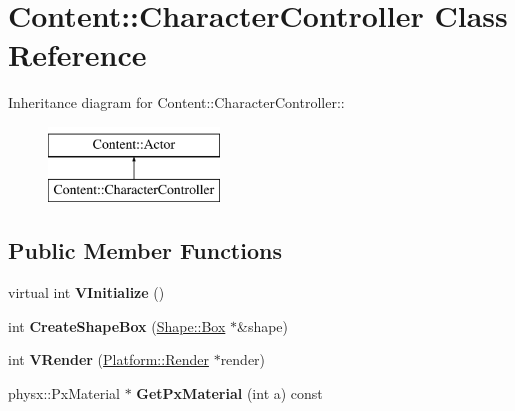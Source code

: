 \hypertarget{classContent_1_1CharacterController}{
\section{Content::CharacterController Class Reference}
\label{classContent_1_1CharacterController}
}
Inheritance diagram for Content::CharacterController::\begin{figure}[H]
\begin{center}
\leavevmode
\includegraphics[height=2cm]{classContent_1_1CharacterController}
\end{center}
\end{figure}
\subsection*{Public Member Functions}
\begin{DoxyCompactItemize}
\item 
\hypertarget{classContent_1_1CharacterController_a5b173399d57dc8ce504e9eed01fa4b4d}{
virtual int {\bfseries VInitialize} ()}
\label{classContent_1_1CharacterController_a5b173399d57dc8ce504e9eed01fa4b4d}

\item 
\hypertarget{classContent_1_1CharacterController_a9a47c329c1de668b092aca62f4e168fc}{
int {\bfseries CreateShapeBox} (\hyperlink{classContent_1_1Shape_1_1Box}{Shape::Box} $\ast$\&shape)}
\label{classContent_1_1CharacterController_a9a47c329c1de668b092aca62f4e168fc}

\item 
\hypertarget{classContent_1_1CharacterController_aec58535b60214bf17726b94b78a15b2d}{
int {\bfseries VRender} (\hyperlink{classPlatform_1_1Render}{Platform::Render} $\ast$render)}
\label{classContent_1_1CharacterController_aec58535b60214bf17726b94b78a15b2d}

\item 
\hypertarget{classContent_1_1CharacterController_a555505bcb9b019fcaca3664ae44c0920}{
physx::PxMaterial $\ast$ {\bfseries GetPxMaterial} (int a) const }
\label{classContent_1_1CharacterController_a555505bcb9b019fcaca3664ae44c0920}

\end{DoxyCompactItemize}
